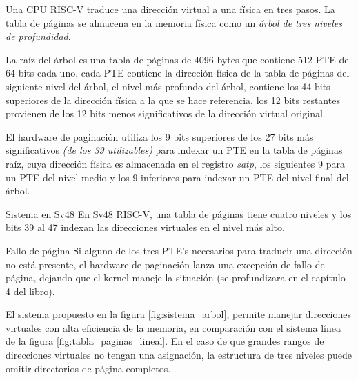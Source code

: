 \documentclass{libs/ufc_format}
\begin{document}
\begin{frame}{}
    Una CPU RISC-V traduce una dirección virtual a una física en tres pasos. La tabla de páginas se almacena en la memoria física como un \emph{árbol de tres niveles de profundidad}.

    \vspace{0.2cm}
    
    La raíz del árbol es una tabla de páginas de 4096 bytes que contiene 512 PTE de 64 bits cada uno, cada PTE contiene la dirección física de la tabla de páginas del siguiente nivel del árbol, el nivel más profundo del árbol, contiene los 44 bits superiores de la dirección física a la que se hace referencia, los 12 bits restantes provienen de los 12 bits menos significativos de la dirección virtual original. \cite{xv6_book}
\end{frame}
\begin{frame}{}
     El hardware de paginación utiliza los 9 bits superiores de los 27 bits más significativos \emph{(de los 39 utilizables)} para indexar un PTE en la tabla de páginas raíz, cuya dirección física es almacenada en el registro \emph{satp}, los siguientes 9 para un PTE del nivel medio y los 9 inferiores para indexar un PTE del nivel final del árbol. \cite{xv6_book}

     \vspace{0.4cm}

    \begin{block}{Sistema en Sv48}
        En Sv48 RISC-V, una tabla de páginas tiene cuatro niveles y los bits 39 al 47 indexan las direcciones virtuales en el nivel más alto. \cite{xv6_book}
    \end{block}
\end{frame}
\begin{frame}{Fallo de página}
    Si alguno de los tres PTE's necesarios para traducir una dirección no está presente, el hardware de paginación lanza una excepción de fallo de página, dejando que el kernel maneje la situación (se profundizara en el capítulo 4 del libro). \cite{xv6_book}

    \vspace{0.3cm}

    El sistema propuesto en la figura \ref{fig:sistema_arbol}, permite manejar direcciones virtuales con alta eficiencia de la memoria, en comparación con el sistema línea de la figura \ref{fig:tabla_paginas_lineal}. En el caso de que grandes rangos de direcciones virtuales no tengan una asignación, la estructura de tres niveles puede omitir directorios de página completos.
\end{frame}
\end{document}
